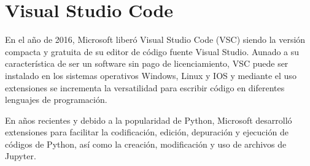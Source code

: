 \section{Visual Studio Code}
En el año de 2016, Microsoft liberó Visual Studio Code (VSC) siendo la versión compacta y gratuita de su editor de código fuente Visual Studio. Aunado a su característica de ser un software sin pago de licenciamiento, VSC puede ser instalado en los sistemas operativos Windows, Linux y IOS y mediante el uso extensiones se incrementa la versatilidad para escribir código en diferentes lenguajes de programación.\bigskip

En años recientes y debido a la popularidad de Python, Microsoft desarrolló extensiones para facilitar la codificación, edición, depuración y ejecución de códigos  de Python, así como la creación, modificación y uso de archivos de Jupyter.
